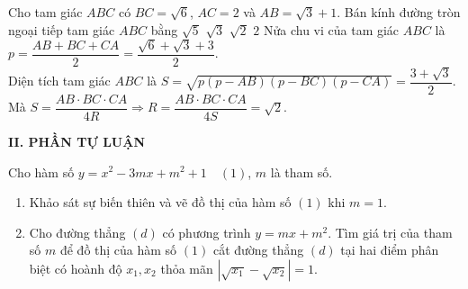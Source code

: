 \begin{ex}%
Cho tam giác $ABC$ có $BC=\sqrt{6}$, $AC=2$ và $AB=\sqrt{3}+1$. Bán kính đường tròn ngoại tiếp tam giác $ABC$ bằng
\choice
{$\sqrt{5}$}
{$\sqrt{3}$}
{\True $\sqrt{2}$}
{$2$}
\loigiai
{Nửa chu vi của tam giác $ABC$ là $p=\dfrac{AB+BC+CA}{2}=\dfrac{\sqrt{6}+\sqrt{3}+3}{2}$.\\Diện tích tam giác $ABC$ là $S=\sqrt{p(p-AB)(p-BC)(p-CA)}=\dfrac{3+\sqrt{3}}{2}$.\\Mà $S=\dfrac{AB\cdot BC\cdot CA}{4R}\Rightarrow R=\dfrac{AB\cdot BC\cdot CA}{4S}=\sqrt{2}$.}
\end{ex}
\noindent\textbf{II. PHẦN TỰ LUẬN}
\begin{bt}%
	Cho hàm số $y=x^2-3mx+m^2+1\quad (1)$, $m$ là tham số.
		\begin{enumerate}
			\item Khảo sát sự biến thiên và vẽ đồ thị của hàm số $(1)$ khi $m=1$.
			\item Cho đường thẳng $(d)$ có phương trình $y=mx+m^2$. Tìm giá trị của tham số $m$ để đồ thị của hàm số $(1)$ cắt đường thẳng $(d)$ tại hai điểm phân biệt có hoành độ $x_1, x_2$ thỏa mãn $\left|\sqrt{x_1}-\sqrt{x_2}\right|=1$.
		\end{enumerate}


\end{bt}
